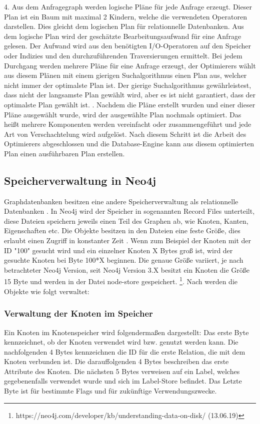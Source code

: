 4. Aus dem Anfragegraph werden logische Pläne für jede Anfrage erzeugt. Dieser Plan ist ein Baum mit maximal 2 Kindern, welche die verwendeten Operatoren darstellen. Dies gleicht dem logischen Plan für relationnelle Datenbanken. Aus dem logische Plan wird der geschätzte Bearbeitungsaufwand für eine Anfrage gelesen. Der Aufwand wird aus den benötigten I/O-Operatoren auf den Speicher oder Indizies und den durchzuführenden Traversierungen ermittelt. Bei jedem Durchgang werden mehrere Pläne für eine Anfrage erzeugt, der Optimierers wählt aus diesem Plänen mit einem gierigen Suchalgorithmus einen Plan aus, welcher nicht immer der optimalste Plan ist. Der gierige Suchalgorithmus gewährleistest, dass nicht der langsamste Plan gewählt wird, aber es ist nicht garantiert, dass der optimalste Plan gewählt ist. \newline {}. Nachdem die Pläne erstellt wurden und einer dieser Pläne ausgewählt wurde, wird der ausgewählte Plan nochmals optimiert. Das heißt mehrere Komponenten werden vereinfacht oder zusammengeführt und jede Art von Verschachtelung wird aufgelöst. \newline \newline
Nach diesem Schritt  ist die Arbeit des Optimierers abgeschlossen und die Database-Engine kann aus diesem optimierten Plan einen ausführbaren Plan erstellen. 

\subsection{Speicherverwaltung in Neo4j}
Graphdatenbanken besitzen eine andere Speicherverwaltung als relationnelle Datenbanken \parencite{angles2012comparison}. In Neo4j wird der Speicher in sogenannten Record Files unterteilt, diese Dateien speichern jeweils einen Teil des Graphen ab, wie Knoten, Kanten, Eigenschaften etc. Die Objekte besitzen in den Dateien eine feste Größe, dies erlaubt einen Zugriff in konstanter Zeit \parencite{robinson2013graph}. Wenn zum Beispiel der Knoten mit der ID "100" gesucht wird und ein einzelner Knoten X Bytes groß ist, wird der gesuchte Knoten bei Byte 100*X beginnen. Die genaue Größe  variiert, je nach betrachteter Neo4j Version, seit Neo4j Version 3.X besitzt ein Knoten die Größe 15 Byte und werden in der Datei node-store gespeichert. \footnote{https://neo4j.com/developer/kb/understanding-data-on-disk/ (13.06.19)}. Nach \parencite{robinson2013graph} werden die Objekte wie folgt verwaltet:
\subsubsection{Verwaltung der Knoten im Speicher}
Ein Knoten im Knotenspeicher wird folgendermaßen dargestellt: Das erste Byte kennzeichnet, ob der Knoten verwendet wird bzw. genutzt werden kann. Die nachfolgenden 4 Bytes kennzeichnen die ID für die erste Relation, die mit dem Knoten verbunden ist. Die darauffolgenden 4 Bytes beschreiben das erste Attribute des Knoten. Die nächsten 5 Bytes verweisen auf ein Label, welches gegebenenfalls verwendet wurde und sich im Label-Store befindet. Das Letzte Byte ist für bestimmte Flags und für zukünftige Verwendungszwecke. 
